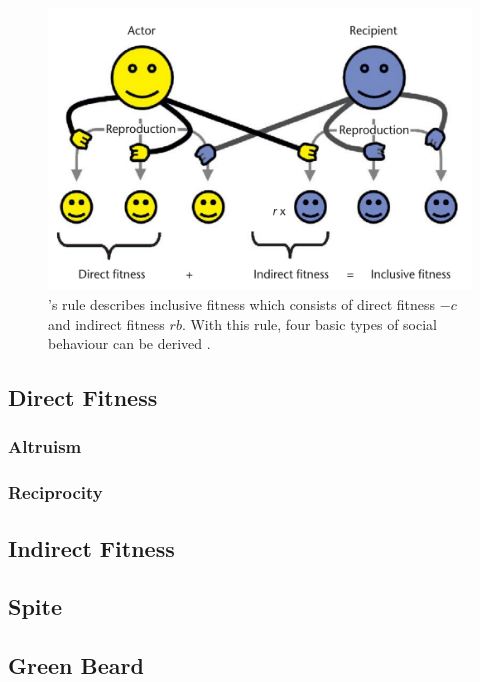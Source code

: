 \documentclass[sigconf]{acmart}
\begin{document}
    \begin{figure}
        \includegraphics[width=\columnwidth]{figures/hamiltons_rule}
        \caption{\citeauthor{hamilton_kin_1964}'s rule describes inclusive fitness which consists of direct fitness $-c$ and indirect fitness $rb$. With this rule, four basic types of social behaviour can be derived \cite{gardner_theory_2009}.}
        \label{fig:hamilton}
    \end{figure}

    \subsection{Direct Fitness}\label{subsec:direct_fit}

    \subsubsection{Altruism}

    \subsubsection{Reciprocity}

    \subsection{Indirect Fitness}\label{indirect_fit}

    \subsection{Spite}

    \subsection{Green Beard}
\end{document}
